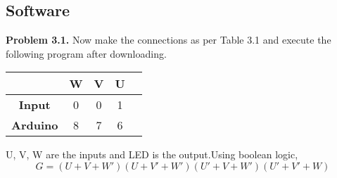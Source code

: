 \documentclass{article}
\begin{document}
\begin{multicols}{2}
\section{Software}

\textbf{Problem 3.1.} Now make the connections as per
Table 3.1 and execute the following program after
downloading.

\vspace{10mm}

\vspace{10mm}
    \centering
    \begin{tabular}{ |c |c |c |c| c|}

\hline
 \textbf{}  & W& V & U \\ 
 \hline
 \textbf{Input}  & 0 & 0 & 1\\
 \textbf{Arduino}  & 8 & 7 & 6 \\  
 \hline
 \end{tabular}
 \vspace{3mm}
 
    \label{table1}


U, V, W are the
inputs and LED is the output.Using boolean
logic,
\begin{equation}
G= (U+V+W') (U+V'+W') (U'+V+W') (U'+V'+W)
\end{equation}
\end{multicols}{}
\end{document}
